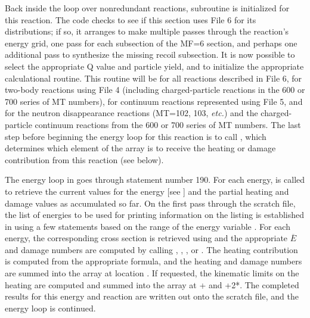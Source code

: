 Back inside the loop over nonredundant reactions, subroutine
 is initialized for this
reaction.  The code checks to see if this section uses File 6
for its distributions; if so, it arranges to make multiple passes
through the reaction's energy grid, one pass for each subsection
of the MF=6 section, and perhaps one additional pass to synthesize
the missing recoil subsection.  It is now possible to select the
appropriate Q value and particle yield, and to initialize the
appropriate calculational routine.  This routine will be
 for all reactions
described in File 6,  for
two-body reactions using File 4 (including charged-particle
reactions in the 600 or 700 series of MT numbers),
 for continuum reactions
represented using File 5, and 
for the neutron disappearance reactions (MT=102, 103, {\it etc.})
and the charged-particle continuum reactions from the 600 or 700
series of MT numbers.  The last step before beginning the energy
loop for this reaction is to call ,
which determines which element of the  array is to receive
the heating or damage contribution from this reaction (see below).

The energy loop in  goes
through statement number 190.  For each energy,
 is called to retrieve the current
values for the energy [see ] and the partial heating
and damage values as accumulated so far.  On the first pass
through the scratch file, the list of energies to be used for
printing information on the listing is established in
 using a few  statements based on the
range of the energy variable .  For each energy, the
corresponding cross section is retrieved using
 and
the appropriate $\overline{E}$ and damage numbers are computed
by calling ,
,
, or
.  The heating contribution
is computed from the appropriate formula, and the heating and damage
numbers are summed into the  array at location .
If requested, the kinematic limits on the heating are computed and
summed into the  array at + and
+2*.  The completed results for this energy and
reaction are written out onto the  scratch file,
and the energy loop is continued.

